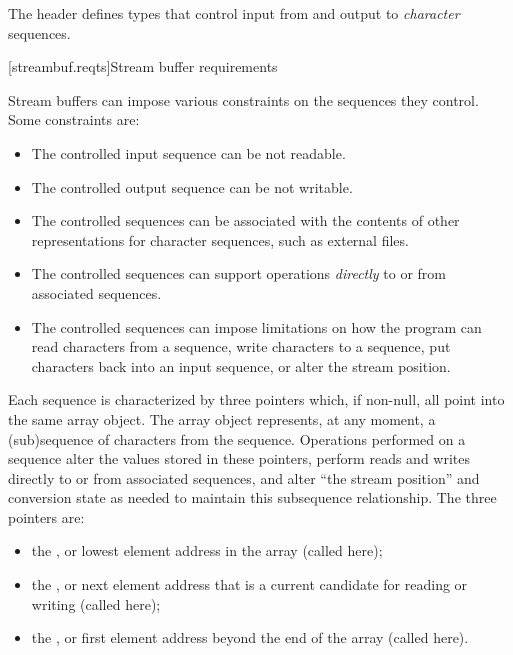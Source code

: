 \pnum
The header 
defines types that control input from and output to
\textit{character} sequences.

[streambuf.reqts]{Stream buffer requirements}

\pnum
Stream buffers can impose various constraints on the sequences they control.
Some constraints are:
\begin{itemize}
\item
The controlled input sequence can be not readable.
\item
The controlled output sequence can be not writable.
\item
The controlled sequences can be associated with the contents of other
representations for character sequences, such as external files.
\item
The controlled sequences can support operations
\textit{directly}
to or from associated sequences.
\item
The controlled sequences can impose limitations on how the program can
read characters from a sequence,
write characters to a sequence,
put characters back into an input sequence, or
alter the stream position.
\end{itemize}

\pnum
Each sequence is characterized by three pointers which, if non-null,
all point into the same
array object.
The array object represents, at any moment,
a (sub)sequence of characters from the sequence.
Operations performed on a sequence alter the values stored in these pointers,
perform reads and writes directly to or from associated sequences, and
alter ``the stream position'' and conversion state as needed to
maintain this subsequence relationship.
The three pointers are:
\begin{itemize}
\item
the
,
or lowest element address in the array
(called  here);
\item
the
,
or next element address that is a current
candidate for reading or writing (called  here);
\item
the
,
or first element address beyond the end of
the array (called  here).
\end{itemize}

